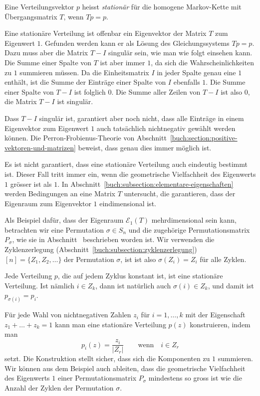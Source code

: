 \begin{definition}
Eine Verteilungsvektor $p$ heisst {\em stationär} für die
homogene Markov-Kette mit Übergangsmatrix $T$, wenn $Tp=p$.
%
\end{definition}

Eine stationäre Verteilung ist offenbar ein Eigenvektor der Matrix
$T$ zum Eigenwert $1$.
Gefunden werden kann er als Lösung des Gleichungssystems $Tp=p$.
Dazu muss aber die Matrix $T-I$ singulär sein, wie man wie folgt
einsehen kann.
Die Summe einer Spalte von $T$ ist aber immer $1$, da sich die
Wahrscheinlichkeiten zu $1$ summieren müssen.
Da die Einheitsmatrix $I$ in jeder Spalte
genau eine $1$ enthält, ist die Summe der Einträge einer Spalte von
$I$ ebenfalls $1$.
Die Summe einer Spalte von $T-I$ ist folglich $0$.
Die Summe aller Zeilen von $T-I$ ist also $0$, die Matrix $T-I$ 
ist singulär.

Dass $T-I$ singulär ist, garantiert aber noch nicht,
dass alle Einträge in einem Eigenvektor zum Eigenwert $1$
auch tatsächlich nichtnegativ gewählt werden können.
Die Perron-Frobienus-Theorie von
%
Abschnitt~\ref{buch:section:positive-vektoren-und-matrizen}
beweist, dass genau dies immer möglich ist.

Es ist nicht garantiert, dass eine stationäre Verteilung
auch eindeutig bestimmt ist.
Dieser Fall tritt immer ein, wenn die geometrische Vielfachheit
des Eigenwerts $1$ grösser ist als $1$.
In Abschnitt~\ref{buch:subsection:elementare-eigenschaften}
werden Bedingungen an eine Matrix $T$ untersucht, die garantieren,
dass der Eigenraum zum Eigenvektor $1$ eindimensional ist.

\begin{beispiel}
Als Beispiel dafür, dass der Eigenraum $\mathcal{E}_1(T)$
mehrdimensional sein kann, betrachten wir eine Permutation $\sigma\in S_n$
%
und die zugehörige Permutationsmatrix $P_\sigma$,
%
wie sie in Abschnitt~\label{buch:section:permutationsmatrizen}
beschrieben worden ist.
Wir verwenden die 
Zyklenzerlegung (Abschnitt~\ref{buch:subsection:zyklenzerlegung})
\(
[n] = \{ Z_1, Z_2,\dots \}
\)
der Permutation $\sigma$, ist ist also $\sigma(Z_i) = Z_i$ für alle
Zyklen.

Jede Verteilung $p$, die auf jedem Zyklus konstant ist, ist eine
stationäre Verteilung.
Ist nämlich $i\in Z_k$, dann ist natürlich auch $\sigma(i)\in Z_k$,
und damit ist $p_{\sigma(i)}=p_i$.

Für jede Wahl von nichtnegativen Zahlen $z_i$ für $i=1,\dots,k$
mit der Eigenschaft $z_1+\dots+z_k=1$ kann man eine stationäre
Verteilung $p(z)$ konstruieren, indem man
\[
p_i(z)
=
\frac{z_i}{|Z_r|}
\qquad\text{wenn}\quad i\in Z_r
\]
setzt.
Die Konstruktion stellt sicher, dass sich die Komponenten zu $1$
summieren.
Wir können aus dem Beispiel auch ableiten, dass die geometrische
Vielfachheit des Eigenwerts $1$ einer Permutationsmatrix $P_\sigma$ 
mindestens so gross ist wie die
Anzahl der Zyklen der Permutation $\sigma$.
\end{beispiel}

